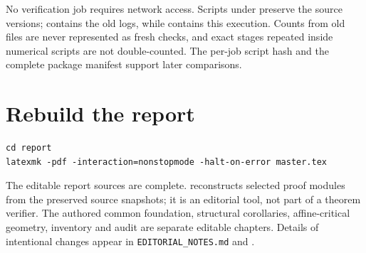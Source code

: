\documentclass[10pt,oneside,openany]{book}
\newcommand{\ModuleTag}{I}
\theoremstyle{remark}\newtheorem{remark}{Remark}[chapter]
\begin{document}
No verification job requires network access. Scripts under  preserve the source versions;  contains the old logs, while  contains this execution. Counts from old files are never represented as fresh checks, and exact stages repeated inside numerical scripts are not double-counted. The per-job script hash and the complete package manifest support later comparisons.

\section{Rebuild the report}\label{rebuild-the-report}

\begin{verbatim}
cd report
latexmk -pdf -interaction=nonstopmode -halt-on-error master.tex
\end{verbatim}

The editable report sources are complete.  reconstructs selected proof modules from the preserved source snapshots; it is an editorial tool, not part of a theorem verifier. The authored common foundation, structural corollaries, affine-critical geometry, inventory and audit are separate editable chapters. Details of intentional changes appear in \texttt{EDITORIAL\_NOTES.md} and .


\backmatter
\renewcommand{\ModuleTag}{B}
\cleardoublepage
{}
{}
\end{document}
